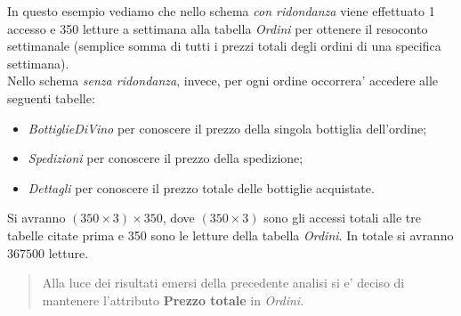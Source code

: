 \begin{flushleft}
In questo esempio vediamo che nello schema \emph{con ridondanza} viene effettuato 1 accesso e 350 letture a settimana alla tabella \emph{Ordini} per ottenere il resoconto settimanale (semplice somma di tutti i prezzi totali degli ordini di una specifica settimana).\\
\vspace{0.5cm}
Nello schema \emph{senza ridondanza}, invece, per ogni ordine occorrera' accedere alle seguenti tabelle:
\begin{itemize}
	\item \emph{BottiglieDiVino} per conoscere il prezzo della singola bottiglia dell'ordine;
	\item \emph{Spedizioni} per conoscere il prezzo della spedizione;
	\item \emph{Dettagli} per conoscere il prezzo totale delle bottiglie acquistate.
\end{itemize}
Si avranno $(350\times3)\times350$, dove $(350\times3)$ sono gli accessi totali alle tre tabelle citate prima e 350 sono le letture della tabella \emph{Ordini}. In totale si avranno $367500$ letture.\\
\begin{verse}
	Alla luce dei risultati emersi della precedente analisi si e' deciso di mantenere l'attributo \textbf{Prezzo totale} in \emph{Ordini}.
\end{verse}
\end{flushleft}
